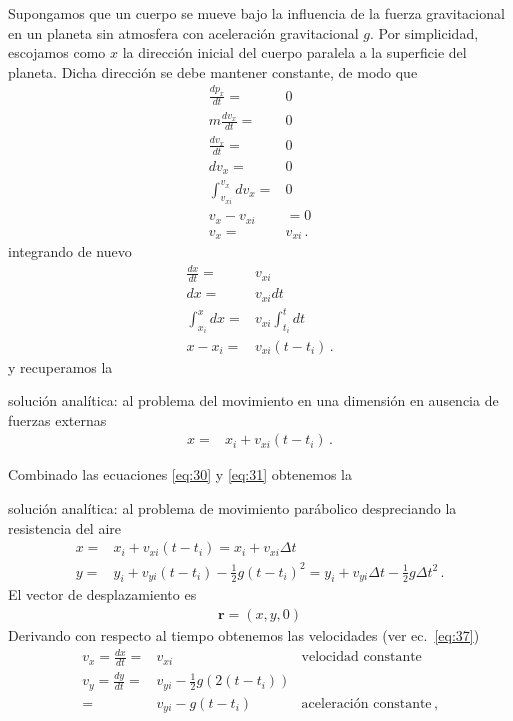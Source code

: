 Supongamos que un cuerpo se mueve bajo la influencia de la fuerza gravitacional en un planeta sin atmosfera con aceleración gravitacional $g$. Por simplicidad, escojamos como $x$ la dirección inicial del cuerpo paralela a la superficie del planeta. Dicha dirección se debe mantener constante, de modo que
\begin{align*}
  \frac{d p_x}{dt}=&0\nonumber\\
  m\frac{d v_x}{dt}=&0\nonumber\\
  \frac{d v_x}{dt}=&0\nonumber\\
  {d v_x}=&0\nonumber\\
  \int_{v_{xi}}^{v_x}{d v_x}=&0\nonumber\\
  v_x-v_{xi}&=0\nonumber\\
  v_x=&v_{xi}\,.
\end{align*}
integrando de nuevo
\begin{align}
  \frac{dx}{dt}=&v_{xi}\nonumber\\
  dx=&v_{xi}{dt}\nonumber\\
  \int_{x_i}^x dx=&v_{xi}\int_{t_i}^t{dt}\nonumber\\
  x-x_i=&v_{xi}(t-t_i)\,.
\end{align}
y recuperamos la
\begin{frame}
  \begin{block}%
{solución analítica:} al problema del movimiento en una dimensión en ausencia de fuerzas externas
\begin{align}
  \label{eq:30}
  x=&x_i+v_{xi}(t-t_i)\,.
\end{align}
  \end{block}
\end{frame}

Combinado las ecuaciones \eqref{eq:30} y \eqref{eq:31} obtenemos la
\begin{frame}
  \begin{block}%
{solución analítica:} al problema de movimiento parábolico despreciando la resistencia del aire
\begin{align}
  \label{eq:32}
  x=&x_i+v_{xi}(t-t_i)=x_i+v_{xi}\Delta t\nonumber\\
  y=&y_i+v_{yi}(t-t_i)-\frac{1}{2}g(t-t_i)^2=y_i+v_{yi}\Delta t-\frac{1}{2}g\Delta t^2\,.
\end{align}
El vector de desplazamiento es
\begin{align}
\mathbf{r}=(x,y,0)
\end{align}
Derivando con respecto al tiempo obtenemos las velocidades (ver ec.~\eqref{eq:37})
\begin{align}
  \label{eq:33}
  v_x=\frac{dx}{dt}=&v_{xi}&\text{velocidad constante}\nonumber\\
  v_y=\frac{dy}{dt}=&v_{yi}-\frac{1}{2}g(2(t-t_i))&\nonumber\\
  =&v_{yi}-g(t-t_i)&\text{aceleración constante}\,,
\end{align}

  \end{block}
\end{frame}



